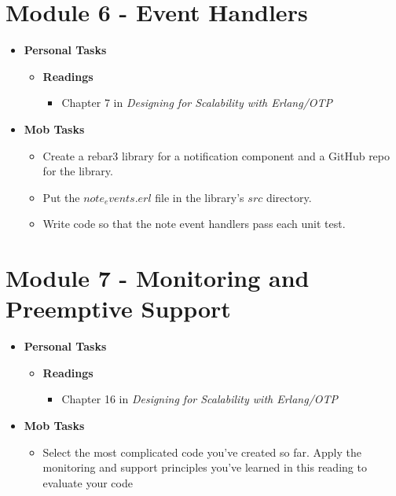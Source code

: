 \documentclass[12pt]{amsart}
\begin{document}
	\section*{Module 6 - Event Handlers} 
	 \begin{itemize}
		\item\textbf{ Personal Tasks}
		\begin{itemize}
            		\item \textbf{Readings}
            		\begin{itemize}
            			\item Chapter 7 in \textit{Designing for Scalability with Erlang/OTP}
            		\end{itemize}
		\end{itemize}
		\item \textbf{Mob Tasks}
		\begin{itemize}
			\item Create a rebar3 library for a notification component and a GitHub repo for the library.
            		\item Put the $note_events.erl$ file in the library's $src$ directory.
            		\item Write code so that the note event handlers pass each unit test. 
		\end{itemize}
	\end{itemize}
	\section*{Module 7 - Monitoring and Preemptive Support}
	 \begin{itemize}
		\item\textbf{ Personal Tasks} 
            	\begin{itemize}
            		\item \textbf{Readings}
            		\begin{itemize}
            			\item Chapter 16 in \textit{Designing for Scalability with Erlang/OTP}
            		\end{itemize}
            	\end{itemize}
		\item \textbf{Mob Tasks}
		\begin{itemize}
		\item Select the most complicated code you've created so far. Apply the monitoring and support principles you've learned in this reading to evaluate your code
		\end{itemize}
	\end{itemize}
\end{document}
